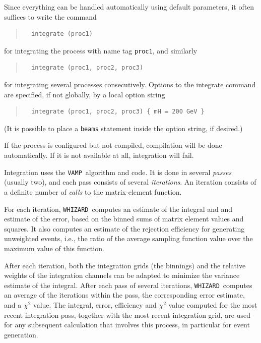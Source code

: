 \documentclass[12pt]{book}
\newcommand{\ttt}[1]{\texttt{#1}}
\newcommand{\whizard}{\texttt{WHIZARD}}
\newcommand{\vamp}{\texttt{VAMP}}
\begin{document}
Since everything can be handled automatically using default parameters, it
often suffices to write the command
\begin{quote}
\begin{footnotesize}
\begin{verbatim}
  integrate (proc1)
\end{verbatim}
\end{footnotesize}
\end{quote}
for integrating the process with name tag \ttt{proc1}, and similarly
\begin{quote}
\begin{footnotesize}
\begin{verbatim}
  integrate (proc1, proc2, proc3)
\end{verbatim}
\end{footnotesize}
\end{quote}
for integrating several processes consecutively.  Options to the integrate
command are specified, if not globally, by a local option string
\begin{quote}
\begin{footnotesize}
\begin{verbatim}
  integrate (proc1, proc2, proc3) { mH = 200 GeV }
\end{verbatim}
\end{footnotesize}
\end{quote}
(It is possible to place a \ttt{beams} statement inside the option string, if
desired.)

If the process is configured but not compiled, compilation will be done
automatically.   If it is not available at all, integration will fail.

Integration uses the \vamp\ algorithm and code.  It is done in several
\emph{passes} (usually two), and each pass consists of several
\emph{iterations}.  An iteration consists of a definite number of \emph{calls}
to the matrix-element function.

For each iteration, \whizard\ computes an estimate of the integral and and
estimate of the error, based on the binned sums of matrix element values and
squares.  It also computes an estimate of the rejection efficiency for
generating unweighted events, i.e., the ratio of the average sampling function
value over the maximum value of this function.

After each iteration, both the integration grids (the binnings) and the
relative weights of the integration channels can be adapted to
minimize the variance estimate of the integral.  After each pass of several
iterations, \whizard\ computes an average of the iterations within the pass,
the corresponding error estimate, and a $\chi^2$ value.  The integral, error,
efficiency and $\chi^2$ value computed for the most recent integration pass,
together with the most recent integration grid, are used for any subsequent
calculation that involves this process, in particular for event generation.
\end{document}
